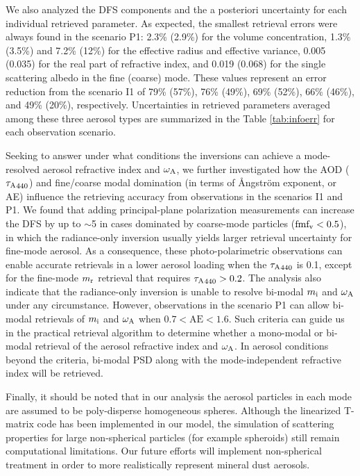 We also analyzed the DFS components and the a posteriori uncertainty for
each individual retrieved parameter. As expected, the smallest retrieval
errors were always found in the scenario P1: 2.3\% (2.9\%) for the volume
concentration, 1.3\% (3.5\%) and 7.2\% (12\%) for the effective radius and
effective variance, 0.005 (0.035) for the real part of refractive index,
and 0.019 (0.068) for the single scattering albedo in the fine (coarse)
mode. These values represent an error reduction from the scenario I1 of
79\% (57\%), 76\% (49\%), 69\% (52\%), 66\% (46\%), and 49\% (20\%), respectively.
Uncertainties in retrieved parameters averaged among these three aerosol
types are summarized in the Table \ref{tab:infoerr} for each observation scenario. 

Seeking to answer under what conditions the inversions can achieve a
mode-resolved aerosol refractive index and $\omega_\text{A}$, we further investigated
how the AOD (${\tau_\text{A}}_{440}$) and fine/coarse modal domination (in terms of
Ångström exponent, or AE) influence the retrieving accuracy from
observations in the scenarios I1 and P1. We found that adding
principal-plane polarization measurements can increase the DFS by up to
$\sim$5 in cases dominated by coarse-mode particles ($\text{fmf}_\text{v}<0.5$), in which
the radiance-only inversion usually yields larger retrieval uncertainty
for fine-mode aerosol. As a consequence, these photo-polarimetric
observations can enable accurate retrievals in a lower aerosol loading
when the ${\tau_\text{A}}_{440}$ is 0.1, except for the fine-mode $m_\text{r}$ retrieval that
requires ${\tau_\text{A}}_{440}>0.2$. The analysis also indicate that the radiance-only
inversion is unable to resolve bi-modal $m_\text{i}$ and $\omega_\text{A}$ under any
circumstance. However, observations in the scenario P1 can allow
bi-modal retrievals of $m_\text{i}$ and $\omega_\text{A}$ when $0.7<\text{AE}<1.6$. 
Such criteria can guide us in the practical retrieval algorithm to determine
whether a mono-modal or bi-modal retrieval of the aerosol refractive index and
$\omega_\text{A}$. In aerosol conditions beyond the criteria, bi-modal PSD along with
the mode-independent refractive index will be retrieved. 

Finally, it should be noted that in our analysis the aerosol particles
in each mode are assumed to be poly-disperse homogeneous spheres.
Although the linearized T-matrix code has been implemented in our model,
the simulation of scattering properties for large non-spherical
particles (for example spheroids) still remain computational
limitations. Our future efforts will implement non-spherical treatment
in order to more realistically represent mineral dust aerosols.

